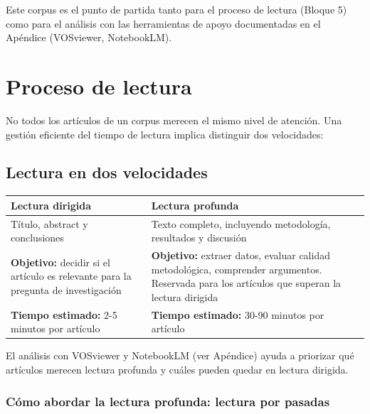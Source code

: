 \documentclass[
]{book}
\newcounter{none} %
\begin{document}
Este corpus es el punto de partida tanto para el proceso de lectura (Bloque 5) como para el análisis con las herramientas de apoyo documentadas en el Apéndice (VOSviewer, NotebookLM).

\chapter{Proceso de lectura}\label{proceso-de-lectura}

No todos los artículos de un corpus merecen el mismo nivel de atención. Una gestión eficiente del tiempo de lectura implica distinguir dos velocidades:

\section{Lectura en dos velocidades}\label{lectura-en-dos-velocidades}

{\def\LTcaptype{none} %
\begin{longtable}[]{@{}
  >{\raggedright\arraybackslash}p{}
  >{\raggedright\arraybackslash}p{}@{}}
\toprule\noalign{}
\begin{minipage}[b]{\linewidth}\raggedright
Lectura dirigida
\end{minipage} & \begin{minipage}[b]{\linewidth}\raggedright
Lectura profunda
\end{minipage} \\
\midrule\noalign{}
\endhead
\bottomrule\noalign{}
\endlastfoot
Título, abstract y conclusiones & Texto completo, incluyendo metodología, resultados y discusión \\
\textbf{Objetivo:} decidir si el artículo es relevante para la pregunta de investigación & \textbf{Objetivo:} extraer datos, evaluar calidad metodológica, comprender argumentos. Reservada para los artículos que superan la lectura dirigida \\
\textbf{Tiempo estimado:} 2-5 minutos por artículo & \textbf{Tiempo estimado:} 30-90 minutos por artículo \\
\end{longtable}
}

El análisis con VOSviewer y NotebookLM (ver Apéndice) ayuda a priorizar qué artículos merecen lectura profunda y cuáles pueden quedar en lectura dirigida.

\subsection{Cómo abordar la lectura profunda: lectura por pasadas}\label{cuxf3mo-abordar-la-lectura-profunda-lectura-por-pasadas}
\end{document}
